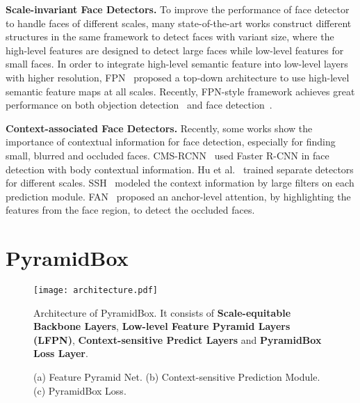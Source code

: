 \documentclass[runningheads]{llncs}
\begin{document}
\textbf{Scale-invariant Face Detectors.}
To improve the performance of face detector to handle faces of different scales,
many state-of-the-art works\cite{Yang2017,Zhang2017,Wang2017b,Najibi2017}
construct different structures in the same framework to detect faces with variant size, where
the high-level features are designed to detect large faces while low-level features for small faces.
In order to integrate high-level semantic feature into low-level layers with higher resolution,
FPN~\cite{Lin2017} proposed a top-down architecture to use high-level semantic feature maps
at all scales. Recently, FPN-style framework achieves great performance on both objection detection~\cite{Lin2017b}
and face detection~\cite{Wang2017b}.



\textbf{Context-associated Face Detectors.} Recently, some works
show the importance of contextual information for face detection,
especially for finding small, blurred and occluded faces.
CMS-RCNN~\cite{Zhu2016} used Faster R-CNN in face detection with body contextual information.
Hu et al.~\cite{Hu2017} trained separate detectors for different scales.
SSH~\cite{Najibi2017} modeled the context information by large filters on each prediction module.
FAN~\cite{Wang2017b} proposed an anchor-level attention, by highlighting the features from
the face region, to detect the occluded faces.



\section{PyramidBox}
\label{sec:pyramidbox}
\begin{figure}[t]
\centering
\texttt{[image: architecture.pdf]}
\caption{Architecture of PyramidBox. It consists of \textbf{Scale-equitable Backbone Layers},
\textbf{Low-level Feature Pyramid Layers (LFPN)},
\textbf{Context-sensitive Predict  Layers}
and \textbf{PyramidBox Loss Layer}.}
\label{fig:architecture}
\end{figure}

\begin{figure}[t]
\centering
{}\hfill
{}\hfill
{}\hfill
\caption{(a) Feature Pyramid Net. (b) Context-sensitive Prediction Module. (c) PyramidBox Loss.}
\label{fig:architecture_detail}
\end{figure}
\end{document}
